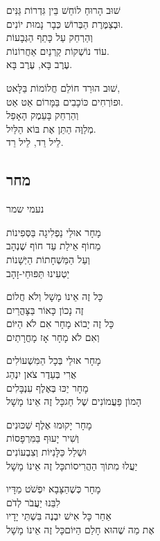 \documentclass[11pt,twoside]{article}
\newcommand{\instruction}[1]{%
\ifhmode\else\noindent\fi%
{\plain\tiny{#1}}%
}
\begin{document}
{{שׁוּב הָרוּחַ לוֹחֵשׁ בֵּין גִּדְרוֹת גַּנִּים\\
וּבְצַמֶּרֶת הַבְּרוֹשׁ כְּבָר נָמוּת יוֹנִים.\\
וְהַרְחֵק עַל כָּתֵף הַגְּבָעוֹת\\
עוֹד נוֹשְׁקוֹת קַרְנַיִם אַחֲרוֹנוֹת.\\
עֶרֶב בָּא, עֶרֶב בָּא.

שׁוּב הוּרַד חוֹלֵם חֲלוֹמוֹת בַּלָּאט,\\
וּפוֹרְחִים כּוֹכָבִים בַּמָּרוֹם אַט אַט.\\
וְהַרְחֵק בָּעֵמֶק הָאָפֵל\\
מְלַוֶּה הַתַּן אֶת בּוֹא הַלַּיִל.\\
לֵיל רֵד, לֵיל רֵד.

\vfill%
\subsection{מחר}
\vspace{-\baselineskip}%
{\centering\instruction{נעמי שמר}\par}

מָחָר אוּלַי נַפְלִיגָה בַּסְּפִינוֹת\\
מֵחוֹף אֵילַת עַד חוֹף שֶׁנְהָב\\
וְעַל הַמַּשְׁחָתוֹת הַיְּשָׁנוֹת\\
יַטְעִינוּ תַּפּוּחֵי-זָהָב

{\large%
כָּל זֶה אֵינוֹ מָשָׁל וְלֹא חֲלוֹם\\
זֶה נָכוֹן כָּאוֹר בַּצָּהֳרַיִם\\
כָּל זֶה יָבוֹא מָחָר אִם לֹא הַיּוֹם\\
וְאִם לֹא מָחָר אָז מָחֳרָתַיִם
}

\newpage

מָחָר אוּלַי בְּכָל הַמִּשְׁעוֹלִים\\
אֲרִי בְּעֵדֶר צֹאן יִנְהַג\\
מָחָר יַכּוּ בְּאֶלֶף עִנְבָּלִים\\
הָמוֹן פַּעֲמוֹנִים שֶׁל חַג\hfill{\scriptsize כָּל זֶה אֵינוֹ מָשָׁל}

מָחָר יָקוּמוּ אֶלֶף שִׁכּוּנִים\\
וְשִׁיר יָעוּף בַּמִּרְפָּסוֹת\\
וּשְׁלַל כַּלָּנִיּוֹת וְצִבְעוֹנִים\\
יַעֲלוּ מִתּוֹךְ הַהֲרִיסוֹת\hfill{\scriptsize כָּל זֶה אֵינוֹ מָשָׁל}

מָחָר כְּשֶׁהַצָּבָא יִפְשֹׁט מַדָּיו\\
לִבֵּנוּ יַעֲבֹר לְדֹם \textemdash{}\\
אַחַר כָּל אִישׁ יִבְנֶה בִּשְׁתֵּי יָדָיו\\
אֶת מַה שֶׁהוּא חָלַם הַיּוֹם\hfill{\scriptsize כָּל זֶה אֵינוֹ מָשָׁל}

}}
\end{document}
